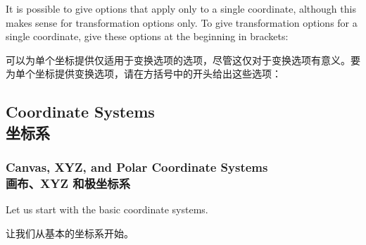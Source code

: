 It is possible to give options that apply only to a single coordinate, although
this makes sense for transformation options only. To give transformation
options for a single coordinate, give these options at the beginning in
brackets:

可以为单个坐标提供仅适用于变换选项的选项，尽管这仅对于变换选项有意义。要为单个坐标提供变换选项，请在方括号中的开头给出这些选项：

%
\begin{codeexample}[]
\end{codeexample}


\subsection{Coordinate Systems\\坐标系}


\subsubsection{Canvas, XYZ, and Polar Coordinate Systems\\画布、XYZ 和极坐标系}

Let us start with the basic coordinate systems.

让我们从基本的坐标系开始。

